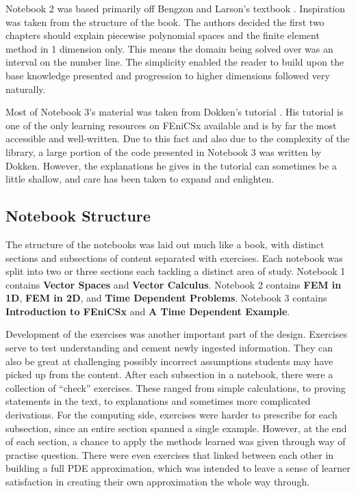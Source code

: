 Notebook 2 was based primarily off Bengzon and Larson's textbook \cite{bengzon-larson-fem}. Inspiration was taken from the structure of the book. The authors decided the first two chapters should explain piecewise polynomial spaces and the finite element method in 1 dimension only. This means the domain being solved over was an interval on the number line. The simplicity enabled the reader to build upon the base knowledge presented and progression to higher dimensions followed very naturally.

Most of Notebook 3's material was taken from Dokken's tutorial \cite{fenics-tutorial}. His tutorial is one of the only learning resources on FEniCSx available and is by far the most accessible and well-written. Due to this fact and also due to the complexity of the library, a large portion of the code presented in Notebook 3 was written by Dokken. However, the explanations he gives in the tutorial can sometimes be a little shallow, and care has been taken to expand and enlighten.

\subsection{Notebook Structure} \label{subsection:notebook-structure}

The structure of the notebooks was laid out much like a book, with distinct sections and subsections of content separated with exercises. Each notebook was split into two or three sections each tackling a distinct area of study. Notebook 1 contains \textbf{Vector Spaces} and \textbf{Vector Calculus}. Notebook 2 contains \textbf{FEM in 1D}, \textbf{FEM in 2D}, and \textbf{Time Dependent Problems}. Notebook 3 contains \textbf{Introduction to FEniCSx} and \textbf{A Time Dependent Example}.

Development of the exercises was another important part of the design. Exercises serve to test understanding and cement newly ingested information. They can also be great at challenging possibly incorrect assumptions students may have picked up from the content. After each subsection in a notebook, there were a collection of ``check'' exercises. These ranged from simple calculations, to proving statements in the text, to explanations and sometimes more complicated derivations. For the computing side, exercises were harder to prescribe for each subsection, since an entire section spanned a single example. However, at the end of each section, a chance to apply the methods learned was given through way of practise question. There were even exercises that linked between each other in building a full PDE approximation, which was intended to leave a sense of learner satisfaction in creating their own approximation the whole way through.

